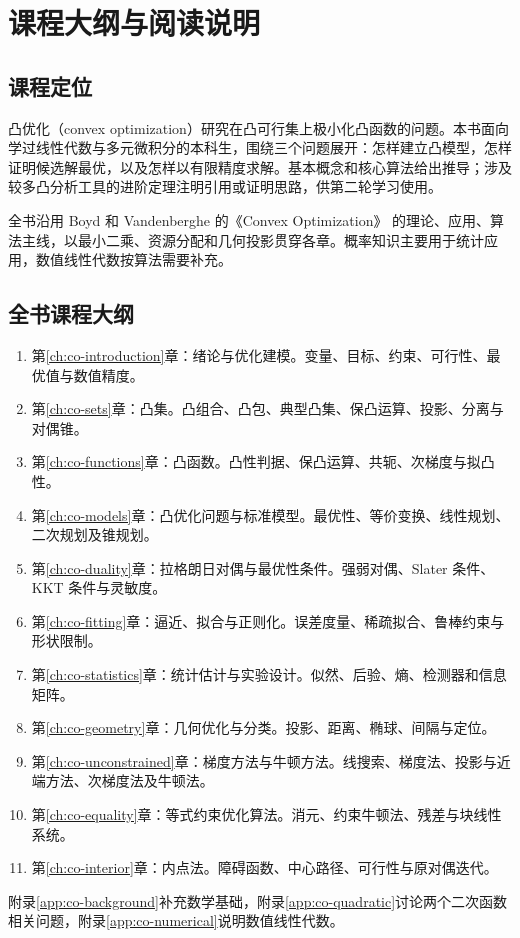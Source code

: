 \chapter*{课程大纲与阅读说明}

\section*{课程定位}

凸优化（convex optimization）研究在凸可行集上极小化凸函数的问题。本书面向学过线性代数与多元微积分的本科生，围绕三个问题展开：怎样建立凸模型，怎样证明候选解最优，以及怎样以有限精度求解。基本概念和核心算法给出推导；涉及较多凸分析工具的进阶定理注明引用或证明思路，供第二轮学习使用。

全书沿用 Boyd 和 Vandenberghe 的《Convex Optimization》\cite{boyd-vandenberghe} 的理论、应用、算法主线，以最小二乘、资源分配和几何投影贯穿各章。概率知识主要用于统计应用，数值线性代数按算法需要补充。

\section*{全书课程大纲}
\begin{enumerate}
  \item 第\ref{ch:co-introduction}章：绪论与优化建模。变量、目标、约束、可行性、最优值与数值精度。
  \item 第\ref{ch:co-sets}章：凸集。凸组合、凸包、典型凸集、保凸运算、投影、分离与对偶锥。
  \item 第\ref{ch:co-functions}章：凸函数。凸性判据、保凸运算、共轭、次梯度与拟凸性。
  \item 第\ref{ch:co-models}章：凸优化问题与标准模型。最优性、等价变换、线性规划、二次规划及锥规划。
  \item 第\ref{ch:co-duality}章：拉格朗日对偶与最优性条件。强弱对偶、Slater 条件、KKT 条件与灵敏度。
  \item 第\ref{ch:co-fitting}章：逼近、拟合与正则化。误差度量、稀疏拟合、鲁棒约束与形状限制。
  \item 第\ref{ch:co-statistics}章：统计估计与实验设计。似然、后验、熵、检测器和信息矩阵。
  \item 第\ref{ch:co-geometry}章：几何优化与分类。投影、距离、椭球、间隔与定位。
  \item 第\ref{ch:co-unconstrained}章：梯度方法与牛顿方法。线搜索、梯度法、投影与近端方法、次梯度法及牛顿法。
  \item 第\ref{ch:co-equality}章：等式约束优化算法。消元、约束牛顿法、残差与块线性系统。
  \item 第\ref{ch:co-interior}章：内点法。障碍函数、中心路径、可行性与原对偶迭代。
\end{enumerate}
附录\ref{app:co-background}补充数学基础，附录\ref{app:co-quadratic}讨论两个二次函数相关问题，附录\ref{app:co-numerical}说明数值线性代数。

